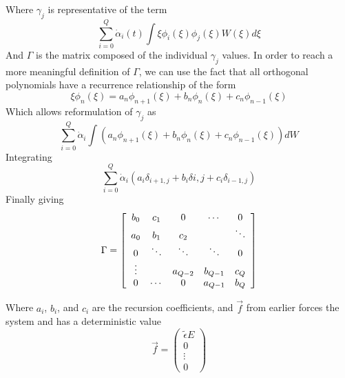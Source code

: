 \documentclass[12pt,letterpaper]{article}
\begin{document}
Where $\gamma_j$ is representative of the term
\begin{equation}
\sum_{i=0}^{Q} \dot{\alpha}_i (t) \int \xi \phi_i (\xi) \phi_j (\xi) W(\xi) d\xi
\end{equation}
And $\Gamma$ is the matrix composed of the individual $\gamma_j$ values. In order to reach a more meaningful definition of $\Gamma$, we can use the fact that all orthogonal polynomials have a recurrence relationship of the form
\begin{equation}
\xi \phi_n (\xi) = a_n \phi_{n+1} (\xi) + b_n \phi_n(\xi) + c_n\phi_{n-1}(\xi)
\end{equation}
Which allows reformulation of $\gamma_j$ as
\begin{equation}
\sum_{i=0}^{Q} \dot{\alpha}_i \int (a_n \phi_{n+1} (\xi) + b_n \phi_n(\xi) + c_n\phi_{n-1}(\xi))dW
\end{equation}
Integrating
\begin{equation}
\sum_{i=0}^{Q} \dot{\alpha}_i \left(a_i \delta_{i+1, j} + b_i \delta{i, j} + c_i \delta_{i-1, j} \right)
\end{equation}
Finally giving 
\begin{equation}
\Gamma = 
\left[ \begin{array}{c c c c c}
b_0		& c_1		& 0			& \cdots	& 0\\
a_0		& b_1		& c_2		& 			& \ddots\\
0		& \ddots	& \ddots	& \ddots	& 0\\
\vdots	& 			& a_{Q-2}	& b_{Q-1}	& c_Q\\
0		& \cdots	& 0			& a_{Q-1}	& b_Q
\end{array} \right]
\end{equation}

Where $a_i$, $b_i$, and $c_i$ are the recursion coefficients, and $\vec{f}$ from earlier forces the system and has a deterministic value 
\begin{equation}
\vec{f} = \left(\begin{array}{c} \tilde{\epsilon} E\\ 0\\ \vdots\\0 \end{array}\right)
\end{equation}
\end{document}
